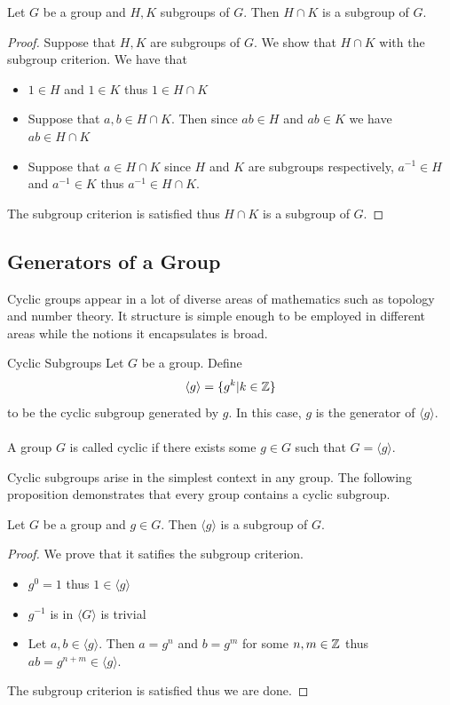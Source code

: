 \documentclass[a4paper]{article}
\begin{document}
\begin{prp}{}{} Let $G$ be a group and $H,K$ subgroups of $G$. Then $H\cap K$ is a subgroup of $G$. \tcbline
\begin{proof} Suppose that $H,K$ are subgroups of $G$. We show that $H\cap K$ with the subgroup criterion. We have that 
\begin{itemize}
\item $1\in H$ and $1\in K$ thus $1\in H\cap K$
\item Suppose that $a,b\in H\cap K$. Then since $ab\in H$ and $ab\in K$ we have $ab\in H\cap K$
\item Suppose that $a\in H\cap K$ since $H$ and $K$ are subgroups respectively, $a^{-1}\in H$ and $a^{-1}\in K$ thus $a^{-1}\in H\cap K$. 
\end{itemize}
The subgroup criterion is satisfied thus $H\cap K$ is a subgroup of $G$. 
\end{proof}
\end{prp}

\subsection{Generators of a Group}
Cyclic groups appear in a lot of diverse areas of mathematics such as topology and number theory. It structure is simple enough to be employed in different areas while the notions it encapsulates is broad. 

\begin{defn}{Cyclic Subgroups}{} Let $G$ be a group. Define $$\langle g\rangle=\{g^k|k\in\mathbb{Z}\}$$ to be the cyclic subgroup generated by $g$. In this case, $g$ is the generator of $\langle g\rangle$. \\~\\
A group $G$ is called cyclic if there exists some $g\in G$ such that $G=\langle g\rangle$. 
\end{defn}

Cyclic subgroups arise in the simplest context in any group. The following proposition demonstrates that every group contains a cyclic subgroup. 

\begin{prp}{}{} Let $G$ be a group and $g\in G$. Then $\langle g\rangle$ is a subgroup of $G$. \tcbline
\begin{proof} We prove that it satifies the subgroup criterion. 
\begin{itemize}
\item $g^0=1$ thus $1\in\langle g\rangle$ 
\item $g^{-1}$ is in $\langle G\rangle$ is trivial
\item Let $a,b\in\langle g\rangle$. Then $a=g^n$ and $b=g^m$ for some $n,m\in\mathbb{Z}$ thus $ab=g^{n+m}\in\langle g\rangle$. 
\end{itemize}
The subgroup criterion is satisfied thus we are done. 
\end{proof}
\end{prp}
\end{document}
